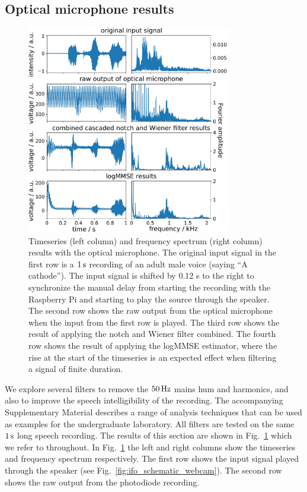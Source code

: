 \documentclass[paper-main.tex]{subfiles}
\begin{document}
\subsection{Optical microphone results}
\label{sec:opticalMicResults}

\begin{figure}
\begin{center}
\includegraphics[width=0.8\textwidth]{figures/combined_highlight_results_melatos_labelled.pdf}
\caption{\label{fig:notchWienerLogMMSEResults}
Timeseries (left column) and frequency spectrum (right column) results with the optical microphone. 
The original input signal in the first row is a $1\,{\rm s}$ recording of an adult male voice (saying ``A cathode''). 
 The input signal is shifted by 0.12 s to the right to synchronize the manual delay from starting the recording with the Raspberry Pi and starting to play the source through the speaker. 
The second row shows the raw output from the optical microphone when the input from the first row is played. 
The third row shows the result of applying the notch and Wiener filter combined. 
The fourth row shows the result of applying the logMMSE estimator, where the rise at the start of the timeseries is an expected effect when filtering a signal of finite duration. 
}
\end{center}
\end{figure}

We explore several filters to remove the $50\,{\rm Hz}$ mains hum and harmonics, and also to improve the speech intelligibility of the recording.
The accompanying Supplementary Material describes a range of analysis techniques that can be used as examples for the undergraduate laboratory. 
All filters are tested on the same $1\,{\rm s}$ long speech recording.
The results of this section are shown in Fig.~\ref{fig:notchWienerLogMMSEResults} which we refer to throughout. 
In Fig.~\ref{fig:notchWienerLogMMSEResults} the left and right columns show the timeseries and frequency spectrum respectively. 
The first row shows the input signal played through the speaker (see Fig.~\ref{fig:ifo_schematic_webcam}). 
The second row shows the raw output from the photodiode recording. 
\end{document}
